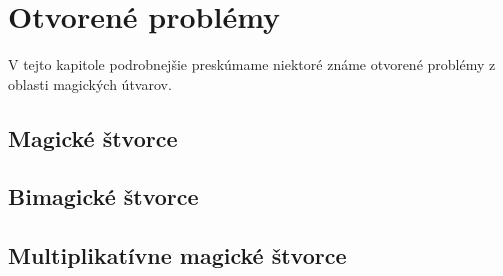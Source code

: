 \chapter{Otvorené problémy}

\label{kap: openproblems} %

V tejto kapitole podrobnejšie preskúmame niektoré známe otvorené problémy z oblasti magických útvarov.

\section{Magické štvorce}

\section{Bimagické štvorce}

\section{Multiplikatívne magické štvorce}

